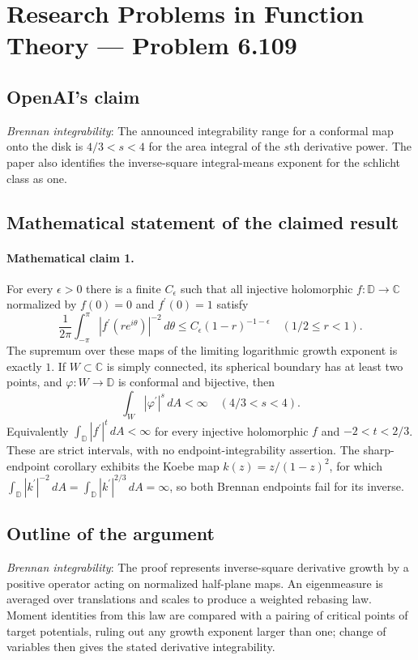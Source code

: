 \documentclass[11pt]{article}
\begin{document}
\section*{Research Problems in Function Theory — Problem 6.109}

\subsection{OpenAI's claim}
\textit{Brennan integrability}: The announced integrability range for a conformal map onto the disk is $4/3<s<4$ for the area integral of the $s$th derivative power. The paper also identifies the inverse-square integral-means exponent for the schlicht class as one.

\subsection{Mathematical statement of the claimed result}
\paragraph{Mathematical claim 1.} For every $\epsilon>0$ there is a finite $C_\epsilon$ such that all injective holomorphic $f:\mathbb D\to\mathbb C$ normalized by $f(0)=0$ and $f^\prime(0)=1$ satisfy \[\frac1{2\pi}\int_{-\pi}^{\pi}|f^\prime(re^{i\theta})|^{-2}\,d\theta\le C_\epsilon(1-r)^{-1-\epsilon}\quad(1/2\le r<1).\] The supremum over these maps of the limiting logarithmic growth exponent is exactly $1$. If $W\subset\mathbb C$ is simply connected, its spherical boundary has at least two points, and $\varphi:W\to\mathbb D$ is conformal and bijective, then \[\int_W|\varphi^\prime|^s\,dA<\infty\quad(4/3<s<4).\] Equivalently $\int_{\mathbb D}|f^\prime|^t\,dA<\infty$ for every injective holomorphic $f$ and $-2<t<2/3$. These are strict intervals, with no endpoint-integrability assertion. The sharp-endpoint corollary exhibits the Koebe map $k(z)=z/(1-z)^2$, for which $\int_{\mathbb D}|k^\prime|^{-2}\,dA=\int_{\mathbb D}|k^\prime|^{2/3}\,dA=\infty$, so both Brennan endpoints fail for its inverse.

\subsection{Outline of the argument}
\textit{Brennan integrability}: The proof represents inverse-square derivative growth by a positive operator acting on normalized half-plane maps. An eigenmeasure is averaged over translations and scales to produce a weighted rebasing law. Moment identities from this law are compared with a pairing of critical points of target potentials, ruling out any growth exponent larger than one; change of variables then gives the stated derivative integrability.
\end{document}
